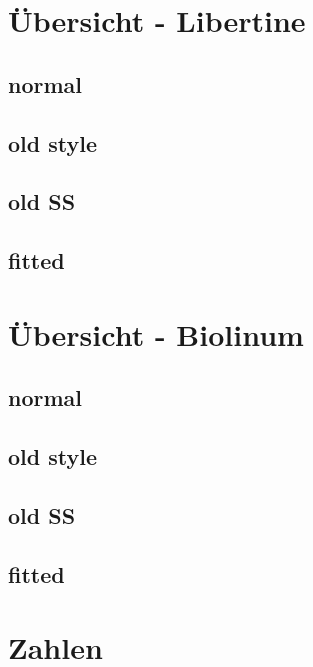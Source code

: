 \documentclass{fontdokuold}
\begin{document}
\section{Übersicht - Libertine}

\subsection{normal}

\subsection{old style}

\subsection{old SS}

\subsection{fitted}

\section{Übersicht - Biolinum}

\subsection{normal}

\subsection{old style}

\subsection{old SS}

\subsection{fitted}

\section{Zahlen}
\end{document}
